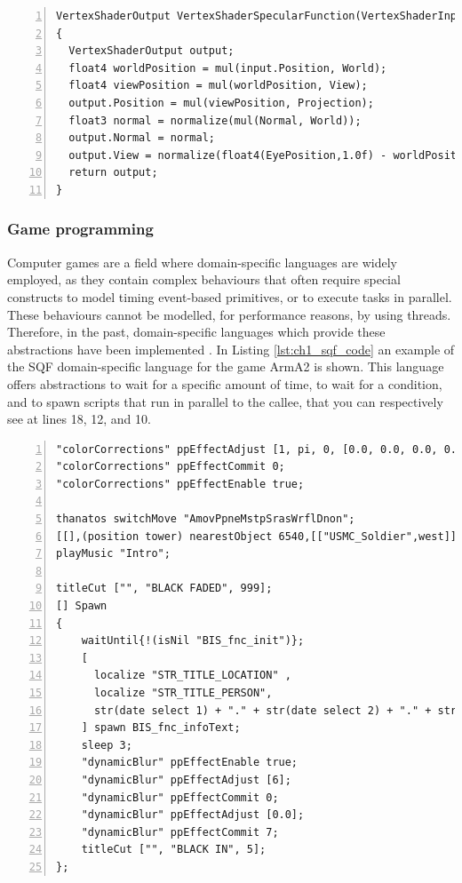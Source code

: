 \begin{lstlisting}[numbers = left, caption = HLSL code to compute the light reflection, label = lst:ch1_hlsl_code]
VertexShaderOutput VertexShaderSpecularFunction(VertexShaderInput input, float3 Normal : NORMAL)
{
  VertexShaderOutput output;
  float4 worldPosition = mul(input.Position, World);
  float4 viewPosition = mul(worldPosition, View);
  output.Position = mul(viewPosition, Projection);
  float3 normal = normalize(mul(Normal, World));
  output.Normal = normal;
  output.View = normalize(float4(EyePosition,1.0f) - worldPosition);
  return output;
}
\end{lstlisting}

\subsubsection*{Game programming}
Computer games are a field where domain-specific languages are widely employed, as they contain complex behaviours that often require special constructs to model timing event-based primitives, or to execute tasks in parallel. These behaviours cannot be modelled, for performance reasons, by using threads. Therefore, in the past, domain-specific languages which provide these abstractions have been implemented \cite{nwnlexicon2018, jass2011, unrealscript2018, sqf2018}. In Listing \ref{lst:ch1_sqf_code} an example of the SQF domain-specific language for the game ArmA2 is shown. This language offers abstractions to wait for a specific amount of time, to wait for a condition, and to spawn scripts that run in parallel to the callee, that you can respectively see at lines 18, 12, and 10.

\begin{lstlisting}[numbers = left, caption = ArmA 2 scripting language, label = lst:ch1_sqf_code]
"colorCorrections" ppEffectAdjust [1, pi, 0, [0.0, 0.0, 0.0, 0.0], [0.05, 0.18, 0.45, 0.5], [0.5, 0.5, 0.5, 0.0]];  
"colorCorrections" ppEffectCommit 0;  
"colorCorrections" ppEffectEnable true;

thanatos switchMove "AmovPpneMstpSrasWrflDnon";
[[],(position tower) nearestObject 6540,[["USMC_Soldier",west]],4,true,[]] execVM "patrolBuilding.sqf";
playMusic "Intro";

titleCut ["", "BLACK FADED", 999];
[] Spawn 
{
	waitUntil{!(isNil "BIS_fnc_init")};
	[
	  localize "STR_TITLE_LOCATION" ,
	  localize "STR_TITLE_PERSON",
	  str(date select 1) + "." + str(date select 2) + "." + str(date select 0)
	] spawn BIS_fnc_infoText;
	sleep 3;
	"dynamicBlur" ppEffectEnable true;   
	"dynamicBlur" ppEffectAdjust [6];   
	"dynamicBlur" ppEffectCommit 0;     
	"dynamicBlur" ppEffectAdjust [0.0];  
	"dynamicBlur" ppEffectCommit 7;
	titleCut ["", "BLACK IN", 5];
};
\end{lstlisting}

